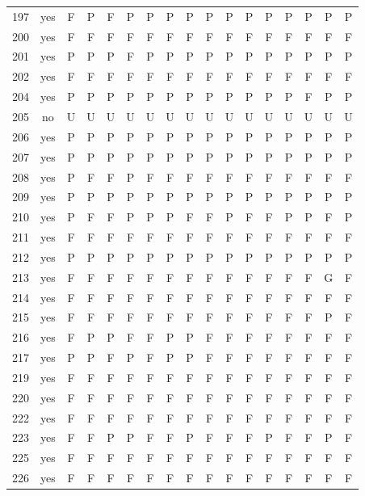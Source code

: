 \begin{table}[p]
\begin{tabular*}{\textwidth}{@{\extracolsep{\fill}}rcccccccccccccccc}
197 & yes & F & P & F & P & P & P & P & P & P & P & P & P & P & P & P\\
200 & yes & F & F & F & F & F & F & F & F & F & F & F & F & F & F & F\\
201 & yes & P & P & P & F & P & P & P & P & P & P & P & P & P & P & P\\
202 & yes & F & F & F & F & F & F & F & F & F & F & F & F & F & F & F\\
204 & yes & P & P & P & P & P & P & P & P & P & P & P & P & F & P & P\\
205 & no & U & U & U & U & U & U & U & U & U & U & U & U & U & U & U\\
206 & yes & P & P & P & P & P & P & P & P & P & P & P & P & P & P & P\\
207 & yes & P & P & P & P & P & P & P & P & P & P & P & P & P & P & P\\
208 & yes & P & F & F & P & F & F & F & F & F & F & F & F & F & F & F\\
209 & yes & P & P & P & P & P & P & P & P & P & P & P & P & P & P & P\\
210 & yes & P & F & F & P & P & P & F & F & P & F & F & P & P & F & P\\
211 & yes & F & F & F & F & F & F & F & F & F & F & F & F & F & F & F\\
212 & yes & P & P & P & P & P & P & P & P & P & P & P & P & P & P & P\\
213 & yes & F & F & F & F & F & F & F & F & F & F & F & F & F & G & F\\
214 & yes & F & F & F & F & F & F & F & F & F & F & F & F & F & F & F\\
215 & yes & F & F & F & F & F & F & F & F & F & F & F & F & F & P & F\\
216 & yes & F & P & P & F & F & P & P & F & F & F & F & F & F & F & F\\
217 & yes & P & P & F & P & F & P & P & F & F & F & F & F & F & F & F\\
219 & yes & F & F & F & F & F & F & F & F & F & F & F & F & F & F & F\\
220 & yes & F & F & F & F & F & F & F & F & F & F & F & F & F & F & F\\
222 & yes & F & F & F & F & F & F & F & F & F & F & F & F & F & F & F\\
223 & yes & F & F & P & P & F & F & P & F & F & F & P & F & F & P & F\\
225 & yes & F & F & F & F & F & F & F & F & F & F & F & F & F & F & F\\
226 & yes & F & F & F & F & F & F & F & F & F & F & F & F & F & F & F\\
\bottomrule\end{tabular*}\end{table}
\clearpage


